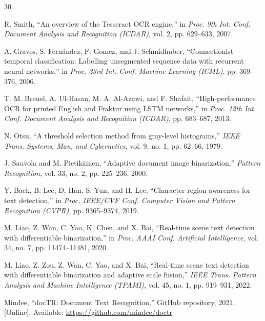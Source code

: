 \documentclass[11pt,a4paper]{article}
\begin{document}
\newpage
\begin{thebibliography}{30}

R. Smith, ``An overview of the Tesseract OCR engine,'' in \textit{Proc. 9th Int. Conf. Document Analysis and Recognition (ICDAR)}, vol. 2, pp. 629--633, 2007.

A. Graves, S. Fern\'andez, F. Gomez, and J. Schmidhuber, ``Connectionist temporal classification: Labelling unsegmented sequence data with recurrent neural networks,'' in \textit{Proc. 23rd Int. Conf. Machine Learning (ICML)}, pp. 369--376, 2006.

T. M. Breuel, A. Ul-Hasan, M. A. Al-Azawi, and F. Shafait, ``High-performance OCR for printed English and Fraktur using LSTM networks,'' in \textit{Proc. 12th Int. Conf. Document Analysis and Recognition (ICDAR)}, pp. 683--687, 2013.

N. Otsu, ``A threshold selection method from gray-level histograms,'' \textit{IEEE Trans. Systems, Man, and Cybernetics}, vol. 9, no. 1, pp. 62--66, 1979.

J. Sauvola and M. Pietik\"ainen, ``Adaptive document image binarization,'' \textit{Pattern Recognition}, vol. 33, no. 2, pp. 225--236, 2000.

Y. Baek, B. Lee, D. Han, S. Yun, and H. Lee, ``Character region awareness for text detection,'' in \textit{Proc. IEEE/CVF Conf. Computer Vision and Pattern Recognition (CVPR)}, pp. 9365--9374, 2019.

M. Liao, Z. Wan, C. Yao, K. Chen, and X. Bai, ``Real-time scene text detection with differentiable binarization,'' in \textit{Proc. AAAI Conf. Artificial Intelligence}, vol. 34, no. 7, pp. 11474--11481, 2020.

M. Liao, Z. Zou, Z. Wan, C. Yao, and X. Bai, ``Real-time scene text detection with differentiable binarization and adaptive scale fusion,'' \textit{IEEE Trans. Pattern Analysis and Machine Intelligence (TPAMI)}, vol. 45, no. 1, pp. 919--931, 2022.

Mindee, ``docTR: Document Text Recognition,'' GitHub repository, 2021. [Online]. Available: \url{https://github.com/mindee/doctr}


\end{thebibliography}
\end{document}
